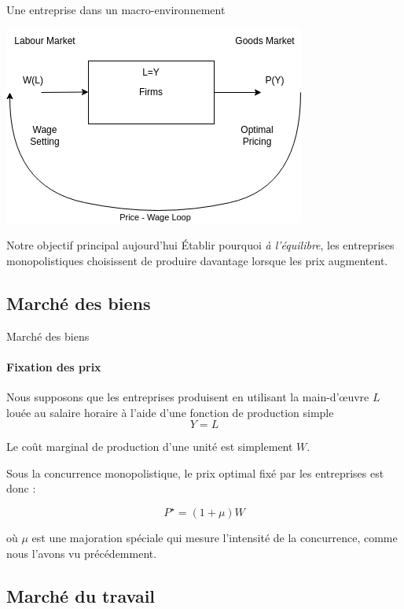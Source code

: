 \documentclass[
  ignorenonframetext,
  aspectratio=169,
]{beamer}
\begin{document}
\begin{frame}{Une entreprise dans un macro-environnement}
\label{une-entreprise-dans-un-macro-environnement}
\begin{center}
\includegraphics[height=0.5\textheight]{assets/thefirm.png}
\end{center}

\begin{block}{Notre objectif principal aujourd'hui}
\label{notre-objectif-principal-aujourdhui}
Établir pourquoi \emph{à l'équilibre}, les entreprises monopolistiques
choisissent de produire davantage lorsque les prix augmentent.
\end{block}
\end{frame}

\subsection{Marché des biens}\label{marchuxe9-des-biens}

\begin{frame}{Marché des biens}
\framesubtitle{Fixation des prix}

Nous supposons que les entreprises produisent en utilisant la
main-d'œuvre \(L\) louée au salaire horaire à l'aide d'une fonction de
production simple \[Y=L\]

Le coût marginal de production d'une unité est simplement \(W\).

Sous la concurrence monopolistique, le prix optimal fixé par les
entreprises est donc :

\[\boxed{P^{\star} = (1+\mu) W}\]

où \(\mu\) est une majoration spéciale qui mesure l'intensité de la
concurrence, comme nous l'avons vu précédemment.
\end{frame}

\subsection{Marché du travail}\label{marchuxe9-du-travail}
\end{document}
